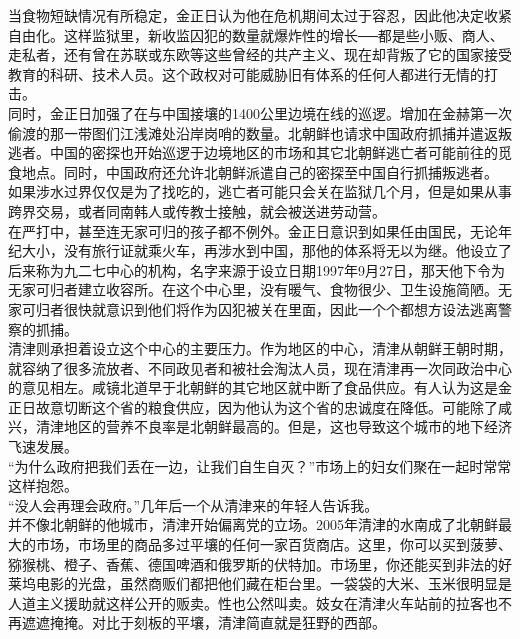 当食物短缺情况有所稳定，金正日认为他在危机期间太过于容忍，因此他决定收紧自由化。这样监狱里，新收监囚犯的数量就爆炸性的增长──都是些小贩、商人、走私者，还有曾在苏联或东欧等这些曾经的共产主义、现在却背叛了它的国家接受教育的科研、技术人员。这个政权对可能威胁旧有体系的任何人都进行无情的打击。\\

同时，金正日加强了在与中国接壤的1400公里边境在线的巡逻。增加在金赫第一次偷渡的那一带图们江浅滩处沿岸岗哨的数量。北朝鲜也请求中国政府抓捕并遣返叛逃者。中国的密探也开始巡逻于边境地区的市场和其它北朝鲜逃亡者可能前往的觅食地点。同时，中国政府还允许北朝鲜派遣自己的密探至中国自行抓捕叛逃者。\\

如果涉水过界仅仅是为了找吃的，逃亡者可能只会关在监狱几个月，但是如果从事跨界交易，或者同南韩人或传教士接触，就会被送进劳动营。\\

在严打中，甚至连无家可归的孩子都不例外。金正日意识到如果任由国民，无论年纪大小，没有旅行证就乘火车，再涉水到中国，那他的体系将无以为继。他设立了后来称为九二七中心的机构，名字来源于设立日期1997年9月27日，那天他下令为无家可归者建立收容所。在这个中心里，没有暖气、食物很少、卫生设施简陋。无家可归者很快就意识到他们将作为囚犯被关在里面，因此一个个都想方设法逃离警察的抓捕。\\

清津则承担着设立这个中心的主要压力。作为地区的中心，清津从朝鲜王朝时期，就容纳了很多流放者、不同政见者和被社会淘汰人员，现在清津再一次同政治中心的意见相左。咸镜北道早于北朝鲜的其它地区就中断了食品供应。有人认为这是金正日故意切断这个省的粮食供应，因为他认为这个省的忠诚度在降低。可能除了咸兴，清津地区的营养不良率是北朝鲜最高的。但是，这也导致这个城市的地下经济飞速发展。\\

“为什么政府把我们丢在一边，让我们自生自灭？”市场上的妇女们聚在一起时常常这样抱怨。\\

“没人会再理会政府。”几年后一个从清津来的年轻人告诉我。\\

并不像北朝鲜的他城市，清津开始偏离党的立场。2005年清津的水南成了北朝鲜最大的市场，市场里的商品多过平壤的任何一家百货商店。这里，你可以买到菠萝、猕猴桃、橙子、香蕉、德国啤酒和俄罗斯的伏特加。市场里，你还能买到非法的好莱坞电影的光盘，虽然商贩们都把他们藏在柜台里。一袋袋的大米、玉米很明显是人道主义援助就这样公开的贩卖。性也公然叫卖。妓女在清津火车站前的拉客也不再遮遮掩掩。对比于刻板的平壤，清津简直就是狂野的西部。\\


